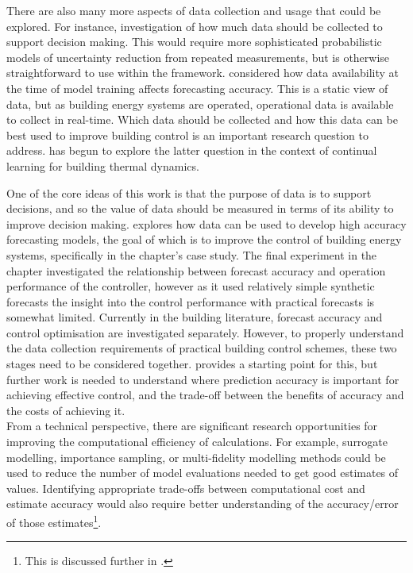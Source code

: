There are also many more aspects of data collection and usage that could be explored. For instance, investigation of how much data should be collected to support decision making. This would require more sophisticated probabilistic models of uncertainty reduction from repeated measurements, but is otherwise straightforward to use within the  framework.  considered how data availability at the time of model training affects forecasting accuracy. This is a static view of data, but as building energy systems are operated, operational data is available to collect in real-time. Which data should be collected and how this data can be best used to improve building control is an important research question to address. \citep{raisch2025AdaptingChangeComparison} has begun to explore the latter question in the context of continual learning for building thermal dynamics.

One of the core ideas of this work is that the purpose of data is to support decisions, and so the value of data should be measured in terms of its ability to improve decision making.  explores how data can be used to develop high accuracy forecasting models, the goal of which is to improve the control of building energy systems, specifically  in the chapter's case study. The final experiment in the chapter investigated the relationship between forecast accuracy and operation performance of the controller, however as it used relatively simple synthetic forecasts the insight into the control performance with practical forecasts is somewhat limited.
Currently in the building  literature, forecast accuracy and control optimisation are investigated separately. However, to properly understand the data collection requirements of practical building control schemes, these two stages need to be considered together.  provides a starting point for this, but further work is needed to understand where prediction accuracy is important for achieving effective control, and the trade-off between the benefits of accuracy and the costs of achieving it.\\

From a technical perspective, there are significant research opportunities for improving the computational efficiency of  calculations. For example, surrogate modelling, importance sampling, or multi-fidelity modelling methods could be used to reduce the number of model evaluations needed to get good estimates of  values. Identifying appropriate trade-offs between computational cost and  estimate accuracy would also require better understanding of the accuracy/error of those  estimates\footnote{This is discussed further in .}.\\

